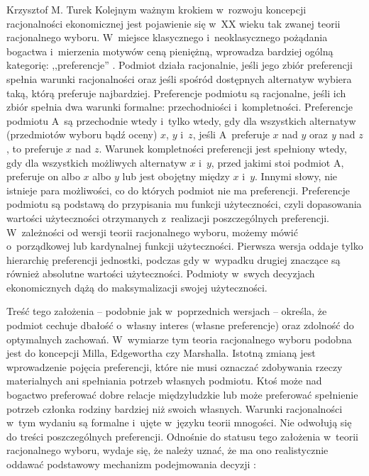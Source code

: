 \begin{artplenv}{Krzysztof M. Turek}
Kolejnym ważnym krokiem w~rozwoju koncepcji racjonalności ekonomicznej jest pojawienie się w~XX wieku tak zwanej teorii
racjonalnego wyboru. W~miejsce klasycznego i~neoklasycznego pożądania bogactwa i~mierzenia motywów ceną pieniężną,
wprowadza bardziej ogólną kategorię: ,,preferencje''
\parencite[s.~119]{hausman_etyka_2017}.
Podmiot
działa racjonalnie, jeśli jego zbiór preferencji spełnia warunki racjonalności oraz jeśli spośród dostępnych alternatyw
wybiera taką, którą preferuje najbardziej. Preferencje podmiotu są racjonalne, jeśli ich zbiór spełnia dwa warunki
formalne: przechodniości i~kompletności. Preferencje podmiotu A~są przechodnie wtedy i~tylko wtedy, gdy dla wszystkich
alternatyw (przedmiotów wyboru bądź oceny) $x$, $y$ i~$z$, jeśli A~preferuje $x$ nad
$y$ oraz \textit{y }nad $z$, to preferuje $x$ nad $z$. Warunek kompletności preferencji
jest spełniony wtedy, gdy dla wszystkich możliwych alternatyw $x$ i~$y$, przed jakimi stoi podmiot A,
preferuje on albo $x$ albo $y$ lub jest obojętny między $x$ i~$y$. Innymi słowy, nie
istnieje para możliwości, co do których podmiot nie ma preferencji. Preferencje podmiotu są podstawą do przypisania mu
funkcji użyteczności, czyli dopasowania wartości użyteczności otrzymanych z~realizacji poszczególnych
preferencji. W~zależności od wersji teorii racjonalnego wyboru, możemy mówić o~porządkowej lub kardynalnej funkcji użyteczności.
Pierwsza wersja oddaje tylko hierarchię preferencji jednostki, podczas gdy w~wypadku drugiej znaczące są również absolutne
wartości użyteczności. Podmioty w~swych decyzjach ekonomicznych dążą do maksymalizacji swojej użyteczności.

Treść tego założenia -- podobnie jak w~poprzednich wersjach -- określa, że podmiot cechuje dbałość o~własny interes
(własne preferencje) oraz zdolność do optymalnych zachowań. W~wymiarze tym teoria racjonalnego wyboru podobna jest do
koncepcji Milla, Edgewortha czy Marshalla. Istotną zmianą jest wprowadzenie pojęcia preferencji, które nie musi
oznaczać zdobywania rzeczy materialnych ani spełniania potrzeb własnych podmiotu. Ktoś może nad bogactwo preferować
dobre relacje międzyludzkie lub może preferować spełnienie potrzeb członka rodziny bardziej niż swoich własnych.
Warunki racjonalności w~tym wydaniu są formalne i~ujęte w~języku teorii mnogości. Nie odwołują się do treści
poszczególnych preferencji. Odnośnie do statusu tego założenia w~teorii racjonalnego wyboru, wydaje się, że należy
uznać, że ma ono realistycznie oddawać podstawowy mechanizm podejmowania decyzji
\parencite[s.~120]{hausman_etyka_2017}:


\end{artplenv}
